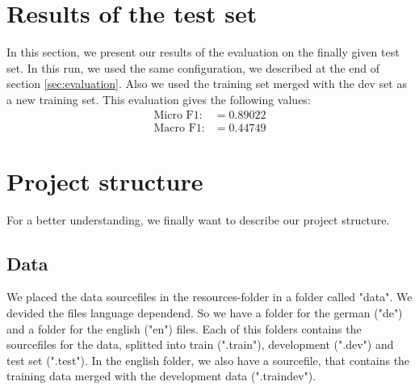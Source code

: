 \documentclass[noindent, nochapname]{tudexercise}
\begin{document}

			\newpage
	
	\section{Results of the test set}
		In this section, we present our results of the evaluation on the finally given test set. In this run, we used the same configuration, we described at the end of section \ref{sec:evaluation}. Also we used the training set merged with the dev set as a new training set. This evaluation gives the following values:
		\begin{align}
\text{Micro F1:} &= 0.89022\\
\text{Macro F1:} &= 0.44749
		\end{align}
	
	\section{Project structure}
		For a better understanding, we finally want to describe our project structure.
		\subsection{Data}
			We placed the data sourcefiles in the resources-folder in a folder called "data". We devided the files language dependend. So we have a folder for the german ("de") and a folder for the english ("en") files. Each of this folders contains the sourcefiles for the data, splitted into train (".train"), development (".dev") and test set (".test"). In the english folder, we also have a sourcefile, that contains the training data merged with the development data (".traindev").
		
\end{document}
